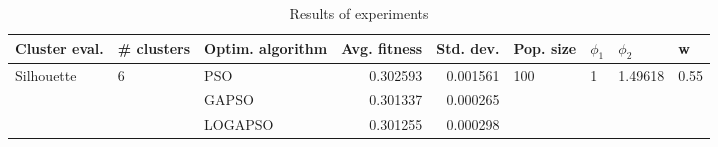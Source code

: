 \begin{table}
\centering
\caption{Results of experiments}
\begin{tabular}{lllrrllll}
\toprule
              Cluster eval. &        \# clusters & Optim. algorithm &  Avg. fitness &  Std. dev. &            Pop. size &         $\phi_{1}$ &               $\phi_{2}$ &                     w \\
\midrule
\multirow{3}{*}{Silhouette} & \multirow{3}{*}{6} &              PSO &      0.302593 &   0.001561 & \multirow{3}{*}{100} & \multirow{3}{*}{1} & \multirow{3}{*}{1.49618} & \multirow{3}{*}{0.55} \\
                            &                    &            GAPSO &      0.301337 &   0.000265 &                      &                    &                          &                       \\
                            &                    &          LOGAPSO &      0.301255 &   0.000298 &                      &                    &                          &                       \\
\bottomrule
\end{tabular}
\end{table}
